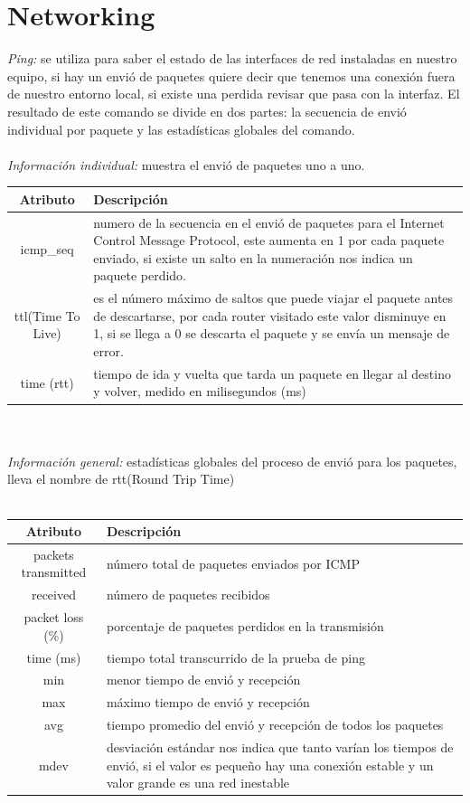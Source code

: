 \documentclass[10pt,a4paper,titlepage]{article}
\begin{document}
	\section*{Networking}
	\emph{Ping:} se utiliza para saber el estado de las interfaces de red instaladas en nuestro equipo, si hay un envió de paquetes quiere decir que tenemos una conexión fuera de nuestro entorno local, si existe una perdida revisar que pasa con la interfaz. El resultado de este comando se divide en dos partes: la secuencia de envió individual por paquete y las estadísticas globales del comando.
	\\
	\\
	\emph{Información individual:} muestra el envió de paquetes uno a uno.
	\\
	\begin{tabular}{|c|p{8cm}|}
		\hline
		Atributo & Descripción \\
		\hline
		icmp\_seq & numero de la secuencia en el envió de paquetes para el Internet Control Message Protocol, este aumenta en 1 por cada paquete enviado, si existe un salto en la numeración nos indica un paquete perdido. \\
		\hline
		ttl(Time To Live) & es el número máximo de saltos que puede viajar el paquete antes de descartarse, por cada router visitado este valor disminuye en 1, si se llega a 0 se descarta el paquete y se envía un mensaje de error. \\
		\hline
		time (rtt) & tiempo de ida y vuelta que tarda un paquete en llegar al destino y volver, medido en milisegundos (ms) \\
		\hline
	\end{tabular}
	\\
	\\
	\emph{Información general:} estadísticas globales del proceso de envió para los paquetes, lleva el nombre de rtt(Round Trip Time)
	\\
	\\
	\begin{tabular}{|c|p{8cm}|}
		\hline
		Atributo & Descripción \\
		\hline
		packets transmitted & número total de paquetes enviados por ICMP \\
		\hline
		received & número de paquetes recibidos \\
		\hline
		packet loss (\%) & porcentaje de paquetes perdidos en la transmisión \\
		\hline
		time (ms) & tiempo total transcurrido de la prueba de ping \\
		\hline
		min & menor tiempo de envió y recepción \\
		\hline
		max & máximo tiempo de envió y recepción \\
		\hline
		avg & tiempo promedio del envió y recepción de todos los paquetes \\
		\hline
		mdev & desviación estándar nos indica que tanto varían los tiempos de envió, si el valor es pequeño hay una conexión estable y un valor grande es una red inestable \\
		\hline
	\end{tabular}
\end{document}
